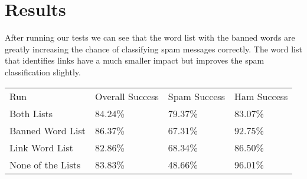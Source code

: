 
\section{Results}
  After running our tests we can see that the word list with the banned words
  are greatly increasing the chance of classifying spam messages correctly. The
  word list that identifies links have a much smaller impact but improves the
  spam classification slightly. 
  \begin{table}[h]
  \begin{tabular}{llll}
  Run               & Overall Success & Spam Success & Ham Success \\
  Both Lists        & 84.24\%         & 79.37\%      & 83.07\%     \\
  Banned Word List  & 86.37\%         & 67.31\%      & 92.75\%     \\
  Link Word List    & 82.86\%         & 68.34\%      & 86.50\%     \\
  None of the Lists & 83.83\%         & 48.66\%      & 96.01\%    
  \end{tabular}
  \end{table}
